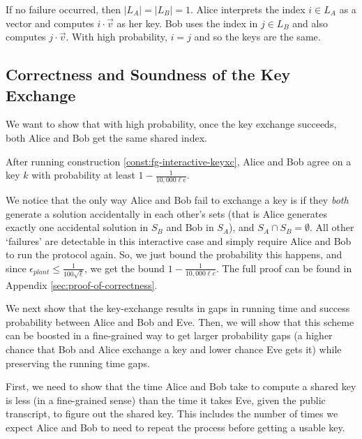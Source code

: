\begin{construction}
\begin{itemize}
		If no failure occurred, then $|L_A| = |L_B| = 1$. Alice interprets the index $i \in L_A$ as a vector and computes $i \cdot \vec v$ as her key. Bob uses the index in $j \in L_B$ and also computes $j \cdot \vec v$. With high probability, $i = j$ and so the keys are the same.
	\end{itemize}
\end{construction}


\subsection{Correctness and Soundness of the Key Exchange}
We want to show that with high probability, once the key exchange succeeds, both Alice and Bob get the same shared index.

\begin{lemma}\label{lem:keyxc-is-correct}
	After running construction \ref{const:fg-interactive-keyxc}, Alice and Bob agree on a key $k$ with probability at least $1 - \frac{1}{10,000 \ell e}$.
\end{lemma}
\begin{proof-sketch}
	We notice that the only way Alice and Bob fail to exchange a key is if they \emph{both} generate a solution accidentally in each other's sets (that is Alice generates exactly one accidental solution in $S_B$ and Bob in $S_A$), and $S_A \cap S_B = \emptyset$. All other `failures' are detectable in this interactive case and simply require Alice and Bob to run the protocol again. So, we just bound the probability this happens, and since $\epsilon_{plant} \le \frac{1}{100 \sqrt \ell}$, we get the bound $1 - \frac{1}{10,000 \ell e}$. The full proof can be found in Appendix \ref{sec:proof-of-correctness}.
\end{proof-sketch}

We next show that the key-exchange results in gaps in running time and success probability between Alice and Bob and Eve. Then, we will show that this scheme can be boosted in a fine-grained way to get larger probability gaps (a higher chance that Bob and Alice exchange a key and lower chance Eve gets it) while preserving the running time gaps. 

First, we need to show that the time Alice and Bob take to compute a shared key is less (in a fine-grained sense) than the time it takes Eve, given the public transcript, to figure out the shared key. This includes the number of times we expect Alice and Bob to need to repeat the process before getting a usable key.

